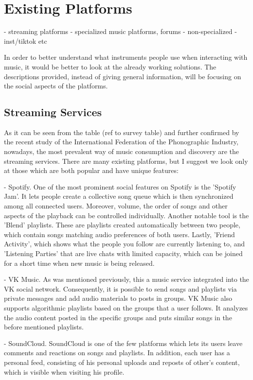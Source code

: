 \chapter{Existing Platforms}
- streaming platforms
- specialized music platforms, forums
- non-specialized - inst/tiktok etc

In order to better understand what instruments people use when interacting with music, it would be better
to look at the already working solutions. The descriptions provided, instead of giving general information,
will be focusing on the social aspects of the platforms.


\section{Streaming Services}
As it can be seen from the table (ref to survey table) and further confirmed by
the recent study of the International Federation of the Phonographic Industry\cite{2},
nowadays, the most prevalent way of music consumption
and discovery are the streaming services. There are many existing platforms,
but I suggest we look only at those which are both popular and have unique features:

- Spotify.
One of the most prominent social features on Spotify is the 'Spotify Jam'\cite{3}.
It lets people create a collective song queue which is then synchronized among all connected users.
Moreover, volume, the order of songs and other aspects of the playback can be controlled individually.
Another notable tool is the 'Blend' playlists\cite{4}. These are playlists created automatically
between two people, which contain songs matching audio preferences of both users.
Lastly, 'Friend Activity'\cite{5}, which shows what the people you follow are currently listening to,
and 'Listening Parties' that are live chats with limited capacity,
which can be joined for a short time when new music is being released\cite{6,7}.

- VK Music.
As was mentioned previously, this a music service integrated into the VK social network.
Consequently, it is possible to send songs and playlists via private messages and add audio materials to
posts in groups. VK Music also supports algorithmic playlists based on the groups that a user follows.
It analyzes the audio content posted in the specific groups and puts similar songs in the before mentioned playlists.

- SoundCloud.
SoundCloud is one of the few platforms which lets its users leave comments and reactions on songs and playlists\cite{8,9}.
In addition, each user has a personal feed, consisting of his personal uploads and
reposts of other's content\cite{10}, which is visible when visiting his profile.

